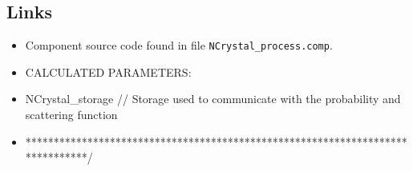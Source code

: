 \subsection*{Links}
\begin{itemize}
  \item Component source code found in file \texttt{NCrystal\_process.comp}.
  \item CALCULATED PARAMETERS:
  \item NCrystal\_storage // Storage used to communicate with the probability and scattering function
  \item *******************************************************************************/
\end{itemize}
